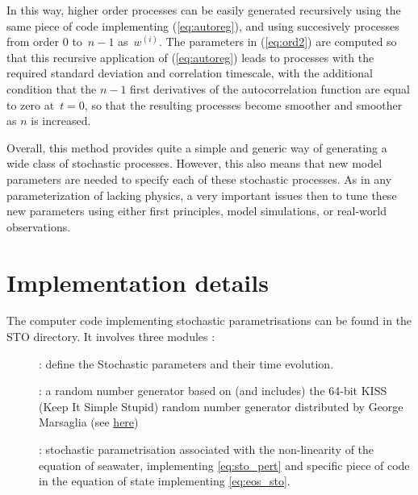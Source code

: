 \documentclass[../tex_main/NEMO_manual]{subfiles}
\begin{document}
\noindent
In this way, higher order processes can be easily generated recursively using 
the same piece of code implementing (\autoref{eq:autoreg}), 
and using succesively processes from order $0$ to~$n-1$ as~$w^{(i)}$.
The parameters in (\autoref{eq:ord2}) are computed so that this recursive application
of (\autoref{eq:autoreg}) leads to processes with the required standard deviation
and correlation timescale, with the additional condition that
the $n-1$ first derivatives of the autocorrelation function
are equal to zero at~$t=0$, so that the resulting processes
become smoother and smoother as $n$ is increased.

Overall, this method provides quite a simple and generic way of generating 
a wide class of stochastic processes. 
However, this also means that new model parameters are needed to specify each of 
these stochastic processes. As in any parameterization of lacking physics, 
a very important issues then to tune these new parameters using either first principles, 
model simulations, or real-world observations.

\section{Implementation details}
\label{sec:STO_thech_details}


The computer code implementing stochastic parametrisations can be found in the STO directory.
It involves three modules : 
\begin{description}
\item[] : define the Stochastic parameters and their time evolution.
\item[] : a random number generator based on (and includes) the 64-bit KISS 
                      (Keep It Simple Stupid) random number generator distributed by George Marsaglia 
                      (see \href{https://groups.google.com/forum/#!searchin/comp.lang.fortran/64-bit$20KISS$20RNGs}{here})
\item[] : stochastic parametrisation associated with the non-linearity of the equation of seawater, 
 implementing \autoref{eq:sto_pert} and specific piece of code in the equation of state implementing \autoref{eq:eos_sto}.
\end{description}
\end{document}
